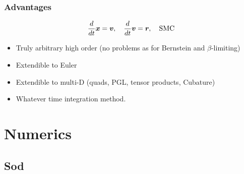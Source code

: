 \documentclass[pt12]{beamer}
\newcommand{\uvec}[2][3]{\boldsymbol{#2\mkern-#1mu}\mkern#1mu}
\begin{document}
\begin{frame}
\frametitle{Advantages}

\begin{align*}
\frac{d}{dt}\uvec{x}=\uvec{v}, \quad \frac{d}{dt}\uvec{v}=\uvec{r}, \quad \text{SMC}
\end{align*}


\begin{itemize}

\item Truly arbitrary high order (no problems as for Bernstein and $\beta$-limiting)

\item Extendible to Euler

\item Extendible to multi-D (quads, PGL, tensor products, Cubature)

\item Whatever time integration method.

\end{itemize}

\end{frame}


\section{Numerics}
\frame\sectionpage

\subsection{Sod}
\end{document}
